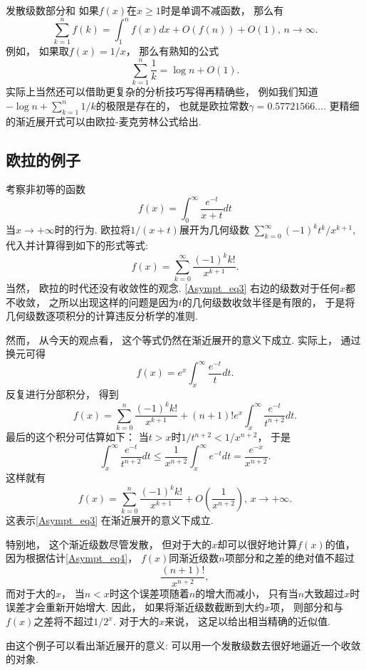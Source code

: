 \begin{example}{发散级数部分和}
如果$f(x)$在$x\geq1$时是单调不减函数， 那么有$$
\sum_{k=1}^nf(k)=\int_1^n f(x)dx+O(f(n))+O(1),\,n\to\infty.
$$
例如， 如果取$f(x)=1/x$， 那么有熟知的公式
$$
\sum_{k=1}^n\frac{1}{k}=\log n+O(1).
$$
实际上当然还可以借助更复杂的分析技巧写得再精确些， 例如我们知道$-\log n+\sum_{k=1}^n1/k$的极限是存在的， 也就是欧拉常数$\gamma=0.57721566...$. 更精细的渐近展开式可以由欧拉-麦克劳林公式给出.
\end{example}

\subsection{欧拉的例子}
考察非初等的函数
$$
f(x)=\int_0^\infty\frac{e^{-t}}{x+t}dt
$$
当$x\to+\infty$时的行为. 欧拉将$1/(x+t)$展开为几何级数
$
\sum_{k=0}^\infty {(-1)^kt^k}/{x^{k+1}},
$
代入并计算得到如下的形式等式:
\begin{equation}\label{Asympt_eq3}
f(x)=\sum_{k=0}^\infty\frac{(-1)^kk!}{x^{k+1}}.
\end{equation}
当然， 欧拉的时代还没有收敛性的观念. \autoref{Asympt_eq3} 右边的级数对于任何$x$都不收敛， 之所以出现这样的问题是因为$t$的几何级数收敛半径是有限的， 于是将几何级数逐项积分的计算违反分析学的准则. 

然而， 从今天的观点看， 这个等式仍然在渐近展开的意义下成立. 实际上， 通过换元可得
$$
f(x)=e^{x}\int_x^\infty \frac{e^{-t}}{t}dt.
$$
反复进行分部积分， 得到
$$
f(x)=\sum_{k=0}^n\frac{(-1)^kk!}{x^{k+1}}
+(n+1)!e^x\int_x^\infty\frac{e^{-t}}{t^{n+2}}dt.
$$
最后的这个积分可估算如下： 当$t>x$时$1/t^{n+2}<1/x^{n+2}$， 于是
\begin{equation}\label{Asympt_eq4}
\int_x^\infty\frac{e^{-t}}{t^{n+2}}dt
\leq\frac{1}{x^{n+2}}\int_x^\infty e^{-t}dt
=\frac{e^{-x}}{x^{n+2}}.
\end{equation}
这样就有
$$
f(x)=\sum_{k=0}^n\frac{(-1)^kk!}{x^{k+1}}
+O\left(\frac{1}{x^{n+2}}\right),\,x\to+\infty.
$$
这表示\autoref{Asympt_eq3} 在渐近展开的意义下成立. 

特别地， 这个渐近级数尽管发散， 但对于大的$x$却可以很好地计算$f(x)$的值， 因为根据估计\autoref{Asympt_eq4}， $f(x)$同渐近级数$n$项部分和之差的绝对值不超过
$$
\frac{(n+1)!}{x^{n+2}},
$$
而对于大的$x$， 当$n<x$时这个误差项随着$n$的增大而减小， 只有当$n$大致超过$x$时误差才会重新开始增大. 因此， 如果将渐近级数截断到大约$x$项， 则部分和与$f(x)$之差将不超过$1/2^x$. 对于大的$x$来说， 这足以给出相当精确的近似值. 

由这个例子可以看出渐近展开的意义: 可以用一个发散级数去很好地逼近一个收敛的对象.